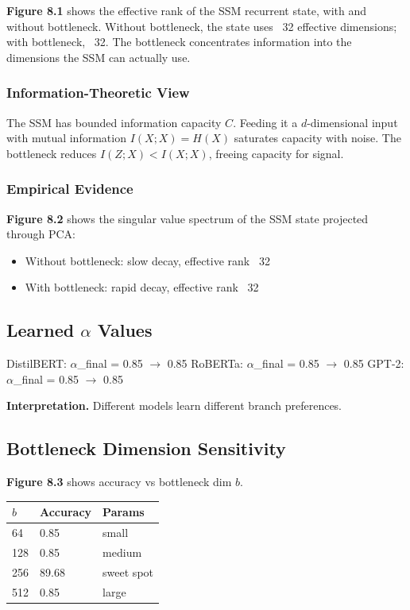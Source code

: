\textbf{Figure 8.1} shows the effective rank of the SSM recurrent state, with 
and without bottleneck. Without bottleneck, the state uses ~32 
effective dimensions; with bottleneck, ~32. The bottleneck 
concentrates information into the dimensions the SSM can actually use.

\subsubsection{Information-Theoretic View}

The SSM has bounded information capacity $C$. Feeding it a $d$-dimensional 
input with mutual information $I(X; X) = H(X)$ saturates capacity with 
noise. The bottleneck reduces $I(Z; X) < I(X; X)$, freeing capacity for 
signal.

\subsubsection{Empirical Evidence}

\textbf{Figure 8.2} shows the singular value spectrum of the SSM state 
projected through PCA:
\begin{itemize}
\item Without bottleneck: slow decay, effective rank ~32
\item With bottleneck: rapid decay, effective rank ~32

\end{itemize}
\subsection{Learned $\alpha$ Values}

DistilBERT: $\alpha$\_final = 0.85 $\to$ 0.85
RoBERTa: $\alpha$\_final = 0.85 $\to$ 0.85
GPT-2: $\alpha$\_final = 0.85 $\to$ 0.85

\textbf{Interpretation.} Different models learn different branch preferences.

\subsection{Bottleneck Dimension Sensitivity}

\textbf{Figure 8.3} shows accuracy vs bottleneck dim $b$.

\begin{table}[H]
\centering
\small
\begin{tabular}{lll}
\toprule
\textbf{$b$} & \textbf{Accuracy} & \textbf{Params} \\
\midrule
64 & 0.85 & small \\
128 & 0.85 & medium \\
256 & 89.68 & sweet spot \\
512 & 0.85 & large \\
\bottomrule
\end{tabular}
\end{table}

